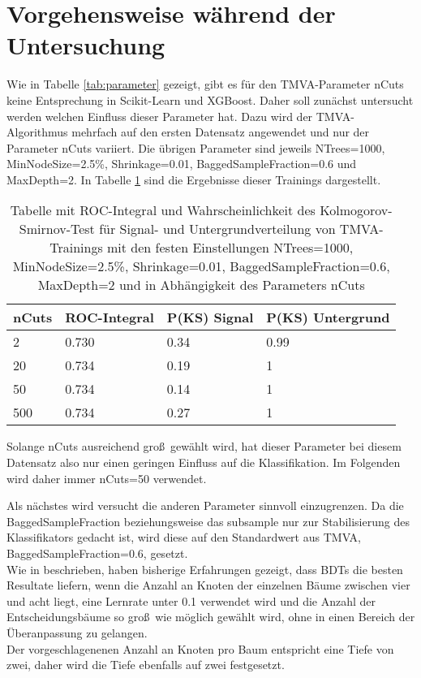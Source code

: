 \section{Vorgehensweise w\"ahrend der Untersuchung}
\label{ch:Vergleich:sec:Vorgehensweise}

Wie in Tabelle \ref{tab:parameter} gezeigt, gibt es f\"ur den TMVA-Parameter nCuts keine Entsprechung in Scikit-Learn und XGBoost. Daher soll zun\"achst untersucht werden welchen Einfluss dieser Parameter hat. Dazu wird der TMVA-Algorithmus mehrfach auf den ersten Datensatz angewendet und nur der Parameter nCuts variiert. Die \"ubrigen Parameter sind jeweils NTrees=1000, MinNodeSize=2.5\%, Shrinkage=0.01, BaggedSampleFraction=0.6 und MaxDepth=2.
In Tabelle \ref{tab:nCuts} sind die Ergebnisse dieser Trainings dargestellt.

\begin{table}[tbp]\parbox{12cm}{
  \caption[Variation des TMVA-nCuts-Parameters]{Tabelle mit ROC-Integral und Wahrscheinlichkeit des Kolmogorov-Smirnov-Test f\"ur Signal- und Untergrundverteilung von TMVA-Trainings mit den festen Einstellungen NTrees=1000, MinNodeSize=2.5\%, Shrinkage=0.01, BaggedSampleFraction=0.6, MaxDepth=2 und in Abh\"angigkeit des Parameters nCuts}%
  }\label{tab:nCuts}
  \begin{center}
  \begin{tabular}{llll}
  \hline
  nCuts & ROC-Integral & P(KS) Signal & P(KS) Untergrund\\
  \hline
  \num{2} & \num{0,730} & \num{0,34} & \num{0,99}\\
 \num{20} & \num{0,734} & \num{0,19} & \num{1}\\
 \num{50} & \num{0,734} & \num{0,14} & \num{1}\\
\num{500} & \num{0,734} & \num{0,27} & \num{1}\\
  \hline
  \end{tabular}
  \end{center}
\end{table}

Solange nCuts ausreichend gro\ss~gew\"ahlt wird, hat dieser Parameter bei diesem Datensatz also nur einen geringen Einfluss auf die Klassifikation. Im Folgenden wird daher immer nCuts=\num{50} verwendet.

Als n\"achstes wird versucht die anderen Parameter sinnvoll einzugrenzen. Da die BaggedSampleFraction beziehungsweise das subsample nur zur Stabilisierung des Klassifikators gedacht ist, wird diese auf den Standardwert aus TMVA, BaggedSampleFraction=\num{0,6}, gesetzt.\\
Wie in \cite{SWB-307748006} beschrieben, haben bisherige Erfahrungen gezeigt, dass BDTs die besten Resultate liefern, wenn die Anzahl an Knoten der einzelnen B\"aume zwischen vier und acht liegt, eine Lernrate unter \num{0,1} verwendet wird und die Anzahl der Entscheidungsb\"aume so gro\ss~wie m\"oglich gew\"ahlt wird, ohne in einen Bereich der \"Uberanpassung zu gelangen.\\
Der vorgeschlagenenen Anzahl an Knoten pro Baum entspricht eine Tiefe von zwei, daher wird die Tiefe ebenfalls auf zwei festgesetzt.

